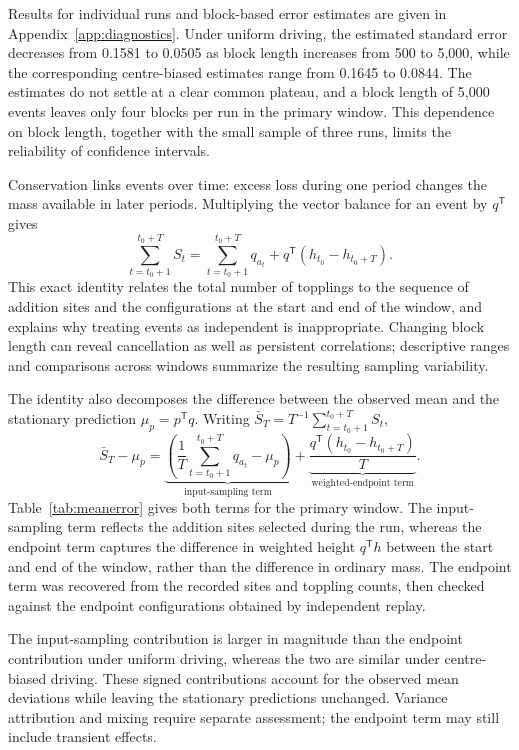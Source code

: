 \documentclass[11pt,a4paper,oneside]{report}
\numberwithin{equation}{chapter}
\begin{document}
Results for individual runs and block-based error estimates are given in Appendix~\ref{app:diagnostics}. Under uniform driving, the estimated standard error decreases from 0.1581 to 0.0505 as block length increases from 500 to 5,000, while the corresponding centre-biased estimates range from 0.1645 to 0.0844. The estimates do not settle at a clear common plateau, and a block length of 5,000 events leaves only four blocks per run in the primary window. This dependence on block length, together with the small sample of three runs, limits the reliability of confidence intervals.

Conservation links events over time: excess loss during one period changes the mass available in later periods. Multiplying the vector balance for an event by $q^{\mathsf T}$ gives
\begin{equation}
 \sum_{t=t_0+1}^{t_0+T}S_t
 =\sum_{t=t_0+1}^{t_0+T}q_{a_t}
   +q^{\mathsf T}(h_{t_0}-h_{t_0+T}).
 \label{eq:weightedbalance}
\end{equation}
This exact identity relates the total number of topplings to the sequence of addition sites and the configurations at the start and end of the window, and explains why treating events as independent is inappropriate. Changing block length can reveal cancellation as well as persistent correlations; descriptive ranges and comparisons across windows summarize the resulting sampling variability.

The identity also decomposes the difference between the observed mean and the stationary prediction $\mu_p=p^{\mathsf T}q$. Writing $\bar S_T=T^{-1}\sum_{t=t_0+1}^{t_0+T}S_t$,
\begin{equation}
 \bar S_T-\mu_p
 =\underbrace{\left(\frac1T\sum_{t=t_0+1}^{t_0+T}q_{a_t}-\mu_p\right)}_{\text{input-sampling term}}
  +\underbrace{\frac{q^{\mathsf T}(h_{t_0}-h_{t_0+T})}{T}}_{\text{weighted-endpoint term}}.
 \label{eq:meandeviation}
\end{equation}
Table~\ref{tab:meanerror} gives both terms for the primary window. The input-sampling term reflects the addition sites selected during the run, whereas the endpoint term captures the difference in weighted height $q^{\mathsf T}h$ between the start and end of the window, rather than the difference in ordinary mass. The endpoint term was recovered from the recorded sites and toppling counts, then checked against the endpoint configurations obtained by independent replay.

\FloatBarrier

The input-sampling contribution is larger in magnitude than the endpoint contribution under uniform driving, whereas the two are similar under centre-biased driving. These signed contributions account for the observed mean deviations while leaving the stationary predictions unchanged. Variance attribution and mixing require separate assessment; the endpoint term may still include transient effects.
\end{document}
